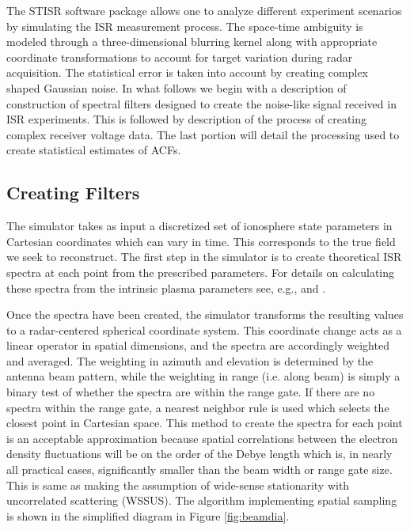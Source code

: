 \documentclass[draft,ras]{agutex}
\begin{document}
\begin{article}
The STISR software package allows one to analyze different  experiment scenarios by simulating the ISR measurement process. %
The space-time ambiguity is modeled through a three-dimensional blurring kernel along with appropriate coordinate transformations to account for target variation during radar acquisition.   The statistical error is taken into account by creating complex shaped Gaussian noise.    
In what follows we begin with a description of construction of spectral filters designed to create the noise-like signal received in ISR experiments. This is followed by description of the process of creating complex receiver voltage data. The last portion will detail the processing used to create statistical estimates of ACFs.

\subsection{Creating Filters}

The simulator takes as input a discretized set of ionosphere state parameters in Cartesian coordinates which can vary in time.  This corresponds to the true field we seek to reconstruct. The first step in the simulator is to create theoretical ISR spectra at each point from the prescribed parameters. For details on calculating these spectra from the intrinsic plasma parameters see, e.g., \citet{kudeki:milla:1} and \citet{kudeki:milla:2}. 

Once the spectra have been created, the simulator transforms the resulting values to a radar-centered spherical coordinate system. This coordinate change acts as a linear operator in spatial dimensions, and the spectra are accordingly weighted and averaged. The weighting in azimuth and elevation is determined by the antenna beam pattern, while the weighting in range (i.e. along beam) is simply a binary test of whether the spectra are within the range gate. If there are no spectra within the range gate, a nearest neighbor rule is used which selects the closest point in Cartesian space. This method to create the spectra for each point is an acceptable approximation because spatial correlations between the electron density fluctuations will be on the order of the Debye length \citep{farley1969} which is, in nearly all practical cases, significantly smaller than the beam width or range gate size. This is same as making the assumption of wide-sense stationarity with uncorrelated scattering (WSSUS)\citep{Kailath:1962jx}. The algorithm implementing spatial sampling is shown in the simplified diagram in Figure \ref{fig:beamdia}.


\end{article}
\end{document}
